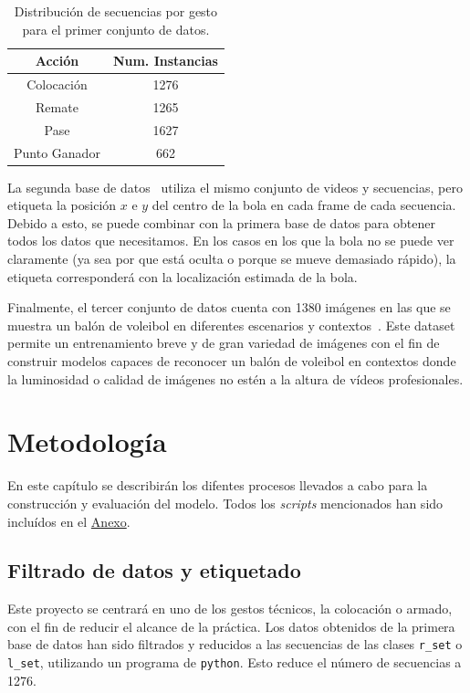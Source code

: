\documentclass[12pt]{report} %
\begin{document}
    \begin{table}[H]
        \begin{tabular}{@{}cc@{}}
            \toprule
            Acción & Num. Instancias\\
            \midrule
            Colocación    & 1276\\
            Remate        & 1265\\
            Pase          & 1627\\
            Punto Ganador &  662\\
            \bottomrule
        \end{tabular}
        \caption{Distribución de secuencias por gesto para el primer conjunto de datos.}
    \end{table}

    La segunda base de datos~\cite{dataset2} utiliza el mismo conjunto de videos y secuencias,
    pero etiqueta la posición $x$ e $y$ del centro de la bola en cada frame de
    cada secuencia. Debido a esto, se puede combinar con la primera base de
    datos para obtener todos los datos que necesitamos. En los casos en los que
    la bola no se puede ver claramente (ya sea por que está oculta o porque se
    mueve demasiado rápido), la etiqueta corresponderá con la localización
    estimada de la bola.

    Finalmente, el tercer conjunto de datos cuenta con 1380 imágenes en las que
    se muestra un balón de voleibol en diferentes escenarios y
    contextos~\cite{dataset3}. Este dataset permite un entrenamiento breve y de
    gran variedad de imágenes con el fin de construir modelos capaces de
    reconocer un balón de voleibol en contextos donde la luminosidad o calidad
    de imágenes no estén a la altura de vídeos profesionales.

    \chapter{Metodología}
    \label{chap:metodologia}
    En este capítulo se describirán los difentes procesos llevados a cabo para la construcción y evaluación del modelo. Todos los \textit{scripts} mencionados han sido incluídos en el \hyperref[anexo]{Anexo}.

    \section{Filtrado de datos y etiquetado}

    Este proyecto se centrará en uno de los gestos técnicos, la colocación o
    armado, con el fin de reducir el alcance de la práctica. Los datos obtenidos
    de la primera base de datos han sido filtrados y reducidos a las secuencias
    de las clases \verb!r_set! o \verb!l_set!, utilizando un programa de
    \verb!python!. Esto reduce el número de
    secuencias a 1276.
\end{document}

